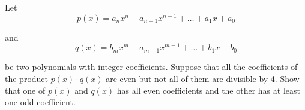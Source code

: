 Let\[p(x) = a_n x^n + a_{n - 1} x^{n - 1} + \dots + a_1 x + a_0\]

and\[q(x) = b_m x^m + a_{m - 1} x^{m - 1} + \dots + b_1 x + b_0\]

be two polynomials with integer coefficients.  Suppose that all the coefficients of the product $p(x) \cdot q(x)$ are even but not all of them are divisible by 4.  Show that one of $p(x)$ and $q(x)$ has all even coefficients and the other has at least one odd coefficient.